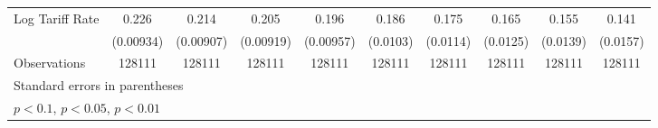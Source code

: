 {\begin{tabular}{l*{9}{c}}
Log Tariff Rate     &       0.226\sym{***}&       0.214\sym{***}&       0.205\sym{***}&       0.196\sym{***}&       0.186\sym{***}&       0.175\sym{***}&       0.165\sym{***}&       0.155\sym{***}&       0.141\sym{***}\\
                    &   (0.00934)         &   (0.00907)         &   (0.00919)         &   (0.00957)         &    (0.0103)         &    (0.0114)         &    (0.0125)         &    (0.0139)         &    (0.0157)         \\
\hline
Observations        &      128111         &      128111         &      128111         &      128111         &      128111         &      128111         &      128111         &      128111         &      128111         \\
\hline\hline
\multicolumn{10}{l}{\footnotesize Standard errors in parentheses}\\
\multicolumn{10}{l}{\footnotesize \sym{*} \(p<0.1\), \sym{**} \(p<0.05\), \sym{***} \(p<0.01\)}\\
\end{tabular}
}
